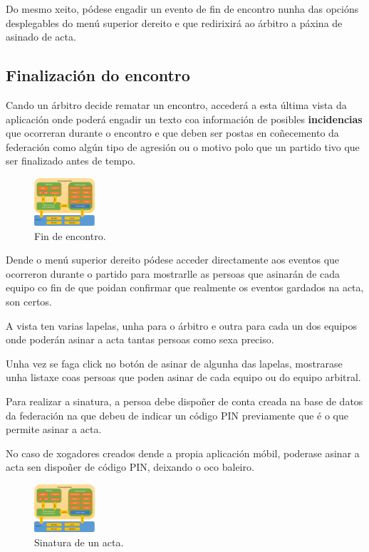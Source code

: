      Do mesmo xeito, pódese engadir un evento de fin de encontro nunha das 
opcións desplegables do menú superior dereito e que redirixirá ao árbitro a 
páxina de asinado de acta.

    \subsection{Finalización do encontro}
    Cando un árbitro decide rematar un encontro, accederá a esta última vista 
da aplicación onde poderá engadir un texto coa información de posibles 
\textbf{incidencias} que ocorreran durante o encontro e que deben ser postas en 
coñecemento da federación como algún tipo de agresión ou o motivo polo que un 
partido tivo que ser finalizado antes de tempo.

    \begin{figure}[h!]
      \begin{center}
      \includegraphics[width=0.2\textwidth]{./img/cordova_arquitectura.png}
      \caption{Fin de encontro.}
      \end{center}
    \end{figure}

    Dende o menú superior dereito pódese acceder directamente aos eventos que 
ocorreron durante o partido para mostrarlle as persoas que asinarán de cada 
equipo co fin de que poidan confirmar que realmente os eventos gardados na 
acta, son certos.

    A vista ten varias lapelas, unha para o árbitro e outra para cada un dos 
equipos onde poderán asinar a acta tantas persoas como sexa preciso.

    Unha vez se faga click no botón de asinar de algunha das lapelas, 
mostrarase unha listaxe coas persoas que poden asinar de cada equipo ou do 
equipo arbitral.

    Para realizar a sinatura, a persoa debe dispoñer de conta creada na base de 
datos da federación na que debeu de indicar un código PIN previamente que é o 
que permite asinar a acta.

    No caso de xogadores creados dende a propia aplicación móbil, poderase 
asinar a acta sen dispoñer de código PIN, deixando o oco baleiro.

    \begin{figure}[h!]
      \begin{center}
      \includegraphics[width=0.2\textwidth]{./img/cordova_arquitectura.png}
      \caption{Sinatura de un acta.}
      \end{center}
    \end{figure}

